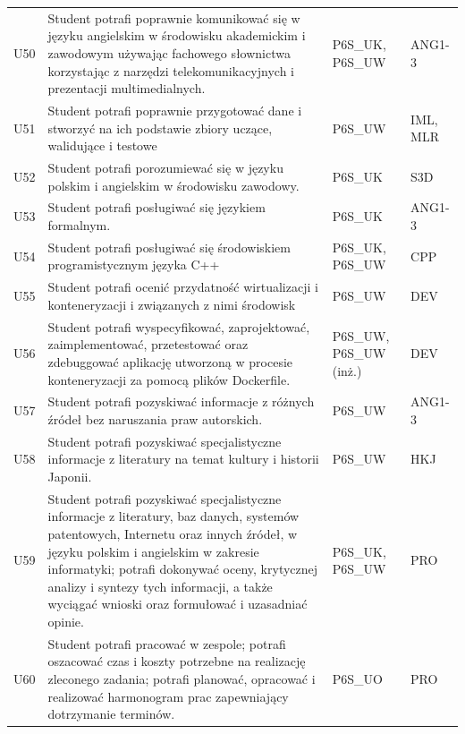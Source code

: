 \documentclass[12pt,a4paper]{article}
\begin{document}
{\begin{longtable}{m{1cm}m{8.8cm}m{2.1cm}m{2.5cm}}
\rowcolor{tableRowAlt} U50 & Student potrafi poprawnie komunikować się w języku angielskim w środowisku akademickim i zawodowym używając fachowego słownictwa korzystając z narzędzi telekomunikacyjnych i prezentacji multimedialnych. & {\scriptsize P6S\_UK, P6S\_UW} & {\scriptsize ANG1-3} \\
\rowcolor{tableRowLight} U51 & Student potrafi poprawnie przygotować dane i stworzyć na ich podstawie zbiory uczące, walidujące i testowe & {\scriptsize P6S\_UW} & {\scriptsize IML, MLR} \\
\rowcolor{tableRowAlt} U52 & Student potrafi porozumiewać się w języku polskim i angielskim w środowisku zawodowy. & {\scriptsize P6S\_UK} & {\scriptsize S3D} \\
\rowcolor{tableRowLight} U53 & Student potrafi posługiwać się językiem formalnym. & {\scriptsize P6S\_UK} & {\scriptsize ANG1-3} \\
\rowcolor{tableRowAlt} U54 & Student potrafi posługiwać się środowiskiem programistycznym języka C++ & {\scriptsize P6S\_UK, P6S\_UW} & {\scriptsize CPP} \\
\rowcolor{tableRowLight} U55 & Student potrafi ocenić przydatność wirtualizacji i konteneryzacji i związanych z nimi środowisk & {\scriptsize P6S\_UW} & {\scriptsize DEV} \\
\rowcolor{tableRowAlt} U56 & Student potrafi wyspecyfikować, zaprojektować, zaimplementować, przetestować oraz zdebuggować aplikację utworzoną w procesie konteneryzacji za pomocą plików Dockerfile. & {\scriptsize P6S\_UW, P6S\_UW {\scriptsize (inż.)}} & {\scriptsize DEV} \\
\rowcolor{tableRowLight} U57 & Student potrafi pozyskiwać informacje z różnych źródeł bez naruszania praw autorskich. & {\scriptsize P6S\_UW} & {\scriptsize ANG1-3} \\
\rowcolor{tableRowAlt} U58 & Student potrafi pozyskiwać specjalistyczne informacje z literatury na temat kultury i historii Japonii. & {\scriptsize P6S\_UW} & {\scriptsize HKJ} \\
\rowcolor{tableRowLight} U59 & Student potrafi pozyskiwać specjalistyczne informacje z literatury, baz danych, systemów patentowych, Internetu oraz innych źródeł, w języku polskim i angielskim w zakresie informatyki; potrafi dokonywać oceny, krytycznej analizy i syntezy tych informacji, a także wyciągać wnioski oraz formułować i uzasadniać opinie. & {\scriptsize P6S\_UK, P6S\_UW} & {\scriptsize PRO} \\
\rowcolor{tableRowAlt} U60 & Student potrafi pracować w zespole; potrafi oszacować czas i koszty potrzebne na realizację zleconego zadania; potrafi planować, opracować i realizować harmonogram prac zapewniający dotrzymanie terminów. & {\scriptsize P6S\_UO} & {\scriptsize PRO} \\

\end{longtable}}
\end{document}
